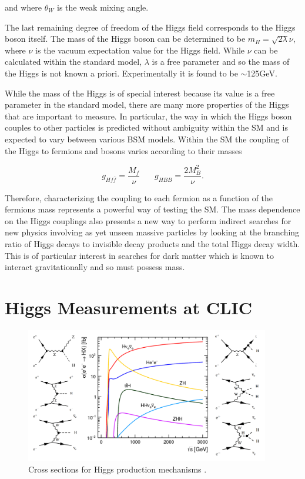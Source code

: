 and where $\theta_{W}$ is the weak mixing angle.

The last remaining degree of freedom of the Higgs field corresponds to the Higgs boson itself. The mass of the Higgs boson can be determined to be $m_{H}=\sqrt{2\lambda}\nu$, where $\nu$ is the vacuum expectation value for the Higgs field. While $\nu$ can be calculated within the standard model, $\lambda$ is a free parameter and so the mass of the Higgs is not known a priori. Experimentally it is found to be $\sim$125GeV\cite{:2012gk,Chatrchyan:2012xdj}.

While the mass of the Higgs is of special interest because its value is a free parameter in the standard model, there are many more properties of the Higgs that are important to measure. In particular, the way in which the Higgs boson couples to other particles is predicted without ambiguity within the \ac{SM} and is expected to vary between various \ac{BSM} models. Within the \ac{SM} the coupling of the Higgs to fermions and bosons varies according to their masses


\begin{equation}
g_{Hf\bar{f}}=\frac{M_f}{\nu} ~~~~~~~~    g_{HBB}=\frac{2M_B^2}{\nu} .
\end{equation}

Therefore, characterizing the coupling to each fermion as a function of the fermions mass represents a powerful way of testing the \ac{SM}. The mass dependence on the Higgs couplings also presents a new way to perform indirect searches for new physics involving as yet unseen massive particles by looking at the branching ratio of Higgs decays to invisible decay products and the total Higgs decay width. This is of particular interest in searches for dark matter which is known to interact gravitationally and so must possess mass. 

\section{Higgs Measurements at CLIC}
\begin{figure}
  \centering
  \includegraphics[width=0.95\textwidth,keepaspectratio]{Theory/fig/HiggsProcessesExtra.png}
  \caption[Cross sections for Higgs production mechanisms]{Cross sections for Higgs production mechanisms \cite{Abramowicz:2016zbo}.}
  \label{fig:higgsXSecs}
\end{figure}

